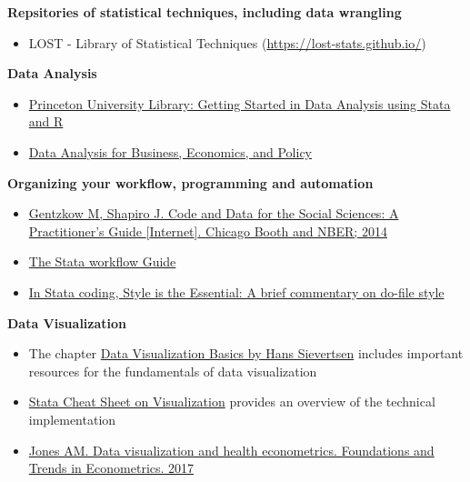 \documentclass[
]{book}
\providecommand{\tightlist}{%
  \setlength{\itemsep}{0pt}\setlength{\parskip}{0pt}}
\begin{document}
\textbf{Repsitories of statistical techniques, including data wrangling}

\begin{itemize}
\tightlist
\item
  LOST - Library of Statistical Techniques
  (\url{https://lost-stats.github.io/})
\end{itemize}

\textbf{Data Analysis}

\begin{itemize}
\tightlist
\item
  \href{https://dss.princeton.edu/training/}{Princeton University
  Library: Getting Started in Data Analysis using Stata and R}
\item
  \href{https://gabors-data-analysis.com/}{Data Analysis for Business,
  Economics, and Policy}
\end{itemize}

\textbf{Organizing your workflow, programming and automation}

\begin{itemize}
\tightlist
\item
  \href{https://web.stanford.edu/~gentzkow/research/CodeAndData.pdf}{Gentzkow
  M, Shapiro J. Code and Data for the Social Sciences: A Practitioner's
  Guide {[}Internet{]}. Chicago Booth and NBER; 2014}
\item
  \href{https://medium.com/the-stata-guide/the-stata-workflow-guide-52418ce35006}{The
  Stata workflow Guide}
\item
  \href{https://michaelshill.net/2015/07/31/in-stata-coding-style-is-the-essential/}{In
  Stata coding, Style is the Essential: A brief commentary on do-file
  style}
\end{itemize}

\textbf{Data Visualization}

\begin{itemize}
\tightlist
\item
  The chapter
  \href{https://hhsievertsen.github.io/EconDataBook/data-visualization-basics.html}{Data
  Visualization Basics by Hans Sievertsen} includes important resources
  for the fundamentals of data visualization
\item
  \href{https://www.stata.com/bookstore/stata-cheat-sheets/}{Stata Cheat
  Sheet on Visualization} provides an overview of the technical
  implementation
\item
  \href{https://doi.org/10.1561/0800000033}{Jones AM. Data visualization
  and health econometrics. Foundations and Trends in Econometrics. 2017}
\end{itemize}
\end{document}
